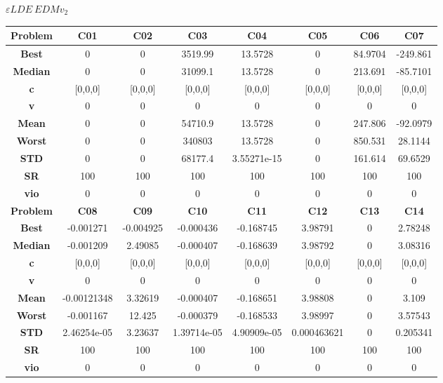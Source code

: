 \documentclass{IEEEtran}
\begin{document}
\begin{center} 
$\varepsilon LDE\ EDMv_2$\\
  \begin{tabular}{|c|c|c|c|c|c|c|c|}
    \hline 
    \textbf{Problem} & \textbf{C01} & \textbf{C02} & \textbf{C03} & \textbf{C04} & \textbf{C05} & \textbf{C06} & \textbf{C07} \\ 
    \hline\hline 
    \textbf{Best} & 0 & 0 & 3519.99 & 13.5728 & 0 & 84.9704 & -249.861\\ 
    \textbf{Median} & 0 & 0 & 31099.1 & 13.5728 & 0 & 213.691 & -85.7101\\ 
    \textbf{c} & [0,0,0] & [0,0,0] & [0,0,0] & [0,0,0] & [0,0,0] & [0,0,0] & [0,0,0]\\ 
    \textbf{v} & 0 & 0 & 0 & 0 & 0 & 0 & 0\\ 
    \textbf{Mean} & 0 & 0 & 54710.9 & 13.5728 & 0 & 247.806 & -92.0979\\ 
    \textbf{Worst} & 0 & 0 & 340803 & 13.5728 & 0 & 850.531 & 28.1144\\ 
    \textbf{STD} & 0 & 0 & 68177.4 & 3.55271e-15 & 0 & 161.614 & 69.6529\\ 
    \textbf{SR} & 100 & 100 & 100 & 100 & 100 & 100 & 100\\ 
    \textbf{vio} & 0 & 0 & 0 & 0 & 0 & 0 & 0\\ 
    \hline 
    \hline 
    \textbf{Problem} & \textbf{C08} & \textbf{C09} & \textbf{C10} & \textbf{C11} & \textbf{C12} & \textbf{C13} & \textbf{C14} \\ 
    \hline\hline 
    \textbf{Best} & -0.001271 & -0.004925 & -0.000436 & -0.168745 & 3.98791 & 0 & 2.78248\\ 
    \textbf{Median} & -0.001209 & 2.49085 & -0.000407 & -0.168639 & 3.98792 & 0 & 3.08316\\ 
    \textbf{c} & [0,0,0] & [0,0,0] & [0,0,0] & [0,0,0] & [0,0,0] & [0,0,0] & [0,0,0]\\ 
    \textbf{v} & 0 & 0 & 0 & 0 & 0 & 0 & 0\\ 
    \textbf{Mean} & -0.00121348 & 3.32619 & -0.000407 & -0.168651 & 3.98808 & 0 & 3.109\\ 
    \textbf{Worst} & -0.001167 & 12.425 & -0.000379 & -0.168533 & 3.98997 & 0 & 3.57543\\ 
    \textbf{STD} & 2.46254e-05 & 3.23637 & 1.39714e-05 & 4.90909e-05 & 0.000463621 & 0 & 0.205341\\ 
    \textbf{SR} & 100 & 100 & 100 & 100 & 100 & 100 & 100\\ 
    \textbf{vio} & 0 & 0 & 0 & 0 & 0 & 0 & 0\\ 

\end{tabular}
\end{center}
\end{document}
